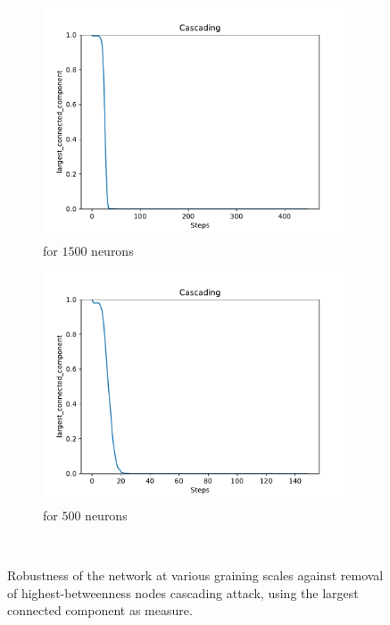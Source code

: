 \begin{figure}
\begin{subfigure}[b]{0.45\textwidth}
		\centering
		\includegraphics[width=\textwidth]{Images/plots_cascading/cascading_38.pdf}
		\caption{for $1500$ neurons}
	\end{subfigure}
	\hfill
	\begin{subfigure}[b]{0.45\textwidth}
		\centering
		\includegraphics[width=\textwidth]{Images/plots_cascading/cascading_40.pdf}
		\caption{for $500$ neurons}
	\end{subfigure}
	\\ \vspace{5mm}
	
	
	\caption{Robustness of the network at various graining scales against removal of highest-betweenness nodes cascading attack, using the largest connected component as measure.}
	\label{fig:cascading_atk}
\end{figure}